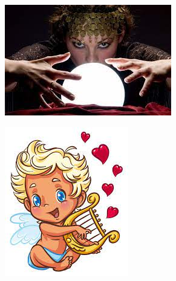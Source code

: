 {\begin{multicols}{2}
\begin{center}
	\begin{center}
		\includegraphics[width=\linewidth]{./IMG-GIT/cristal.jpg}
	\end{center}
\end{center}

\end{multicols}   

\vfill\null
\pagebreak

\begin{center}
	\includegraphics[height=.7\textheight]{./IMG-GIT/anjo.jpg}
	
\end{center}

   \vfill
\pagebreak

%



}
